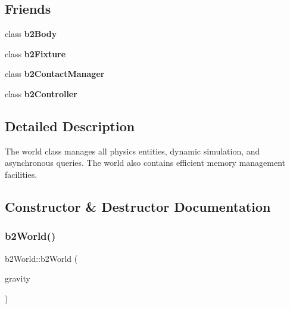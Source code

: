 \subsection*{Friends}
\begin{DoxyCompactItemize}
\item 
\mbox{\label{classb2World_acd34621309c1bdec7335f7545253d704}} 
class {\bfseries b2\+Body}
\item 
\mbox{\label{classb2World_ac3af68958d0520ce98084fc0c5b75f63}} 
class {\bfseries b2\+Fixture}
\item 
\mbox{\label{classb2World_a3bbd3ece64fd6a24342844069f4f6ec0}} 
class {\bfseries b2\+Contact\+Manager}
\item 
\mbox{\label{classb2World_a37fe6cd55c44bb50dac440f8a84474c0}} 
class {\bfseries b2\+Controller}
\end{DoxyCompactItemize}


\subsection{Detailed Description}
The world class manages all physics entities, dynamic simulation, and asynchronous queries. The world also contains efficient memory management facilities. 

\subsection{Constructor \& Destructor Documentation}
\mbox{\label{classb2World_aeccc87fd9e36702c821a8244ca7cd875}} 
\subsubsection{\texorpdfstring{b2\+World()}{b2World()}\hspace{0.1cm}{\footnotesize\ttfamily [1/2]}}
{\footnotesize\ttfamily b2\+World\+::b2\+World (\begin{DoxyParamCaption}\item[{const \hyperlink{structb2Vec2}{b2\+Vec2} \&}]{gravity }\end{DoxyParamCaption})}

